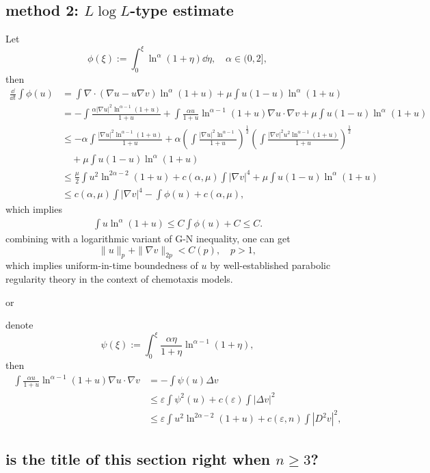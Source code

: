 \subsection{method 2: \texorpdfstring{$L\log L$}{LlogL}-type estimate}
Let 
\[
	\phi(\xi) := \int_0^\xi \ln^\alpha(1+\eta) \dd\eta,\quad\alpha \in (0,2],
\]
then
\begin{align*}
	\frac{\dd}{\dd t}\int\phi(u)
	&= \int \nabla\cdot(\nabla u - u\nabla v) \ln^\alpha(1+u) + \mu\int u(1-u)\ln^\alpha(1+u)\\
	&= - \int \frac{\alpha|\nabla u|^2\ln^{\alpha-1}(1+u)}{1+u}
		+ \int \frac{\alpha u}{1+u} \ln^{\alpha-1}(1+u)\nabla u\cdot\nabla v  + \mu\int u(1-u)\ln^\alpha(1+u)\\
	&\leq - \alpha \int \frac{|\nabla u|^2\ln^{\alpha-1}(1+u)}{1+u}
		+ \alpha\left(\int \frac{|\nabla u|^2\ln^{\alpha-1}}{1+u}\right)^{\frac12}
			\left(\int \frac{|\nabla v|^2u^2\ln^{\alpha-1}(1+u)}{1+u}\right)^{\frac12}\\
	&\quad + \mu\int u(1-u)\ln^\alpha(1+u)\\
	&\leq \frac{\mu}{2}\int u^2\ln^{2\alpha-2}(1+u) + c(\alpha, \mu)\int|\nabla v|^4 
		+ \mu\int u(1-u)\ln^\alpha(1+u)\\
	&\leq c(\alpha, \mu)\int|\nabla v|^4 - \int\phi(u) + c(\alpha, \mu),
\end{align*}
which implies
\begin{align*}
	\int u\ln^\alpha(1+u) \leq C\int \phi(u) + C \leq C.
\end{align*}
combining with a logarithmic variant of G-N inequality, one can get 
\[
	\|u\|_p + \|\nabla v\|_{2p} < C(p), \quad p>1,
\]
which implies uniform-in-time boundedness of $u$ 
by well-established parabolic regularity theory in the context of chemotaxis models.

or

denote 
\[
	\psi(\xi) := \int_0^\xi \frac{\alpha \eta}{1+\eta}\ln^{\alpha-1}(1+\eta),
\]
then 
\begin{align*}
	\int \frac{\alpha u}{1+u} \ln^{\alpha-1}(1+u)\nabla u\cdot\nabla v
	&= - \int \psi(u) \Delta v\\
	&\leq \varepsilon\int \psi^2(u) + c(\varepsilon)\int |\Delta v|^2\\
	&\leq \varepsilon \int u^2\ln^{2\alpha -2}(1+u) + c(\varepsilon, n) \int |D^2 v|^2,
\end{align*}


\subsection{is the title of this section right when \texorpdfstring{$n\geq3$}{n>=3}?}

